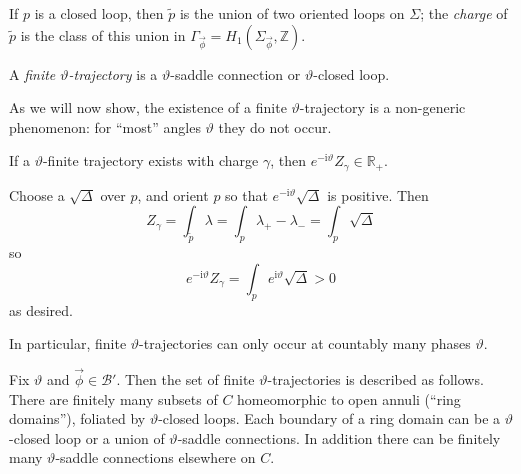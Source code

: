\documentclass[12pt,letterpaper,reqno]{article}
\numberwithin{equation}{section}
\newcommand{\cB}{\ensuremath{\mathcal B}}
\newcommand{\R}{\ensuremath{\mathbb R}}
\newcommand{\Z}{\ensuremath{\mathbb Z}}
\newcommand{\I}{{\mathrm i}}
\newcommand{\ti}[1]{\textit{#1}}
\newcommand{\insfig}[2]{

\medskip
\noindent
\begin{minipage}{\linewidth}

\makebox[\linewidth]{\texttt{[image: figures/\#1-crop.pdf]}}

\end{minipage}
\medskip

}
\begin{document}
\begin{defn}
If $p$ is a closed loop, then $\tilde p$ is the union of two
oriented loops on $\Sigma$; the \ti{charge} of $\tilde p$
is the class of this union in $\Gamma_{\vec\phi} = H_1(\Sigma_{\vec\phi},\Z)$.
\end{defn}

\insfig{higgs-bundles-21}{0.8}

\begin{defn} A
\ti{finite $\vartheta$-trajectory} is a $\vartheta$-saddle connection or
$\vartheta$-closed loop.
\end{defn}

As we will now show, the existence of a finite $\vartheta$-trajectory is a
non-generic phenomenon: for ``most'' angles $\vartheta$ they
do not occur.

\begin{lem}
If a $\vartheta$-finite trajectory exists with charge
$\gamma$, then $e^{- \I \vartheta} Z_\gamma \in \R_+$.
\end{lem}

\begin{pf}
Choose a $\sqrt{\Delta}$ over $p$, and orient $p$
so that $e^{-\I \vartheta} \sqrt{\Delta}$ is positive.
Then
\begin{equation}
Z_\gamma = \int_{\tilde p} \lambda = \int_p \lambda_+ - \lambda_- = \int_p \sqrt{\Delta}
\end{equation}
so
\begin{equation}
	e^{-\I \vartheta} Z_\gamma = \int_p e^{\I \vartheta} \sqrt{\Delta} > 0
\end{equation}
as desired.
\end{pf}

In particular, finite $\vartheta$-trajectories can only
occur at countably many phases $\vartheta$.

\begin{prop}
Fix $\vartheta$ and $\vec\phi \in \cB'$. Then
the set of finite $\vartheta$-trajectories is described as follows.
There are finitely many
subsets of $C$ homeomorphic to open annuli (``ring domains''),
foliated by $\vartheta$-closed loops.
Each boundary of a ring domain can be a $\vartheta$-closed loop
or a union of $\vartheta$-saddle connections.
In addition there can be finitely many $\vartheta$-saddle connections elsewhere on
$C$.
\end{prop}
\end{document}
